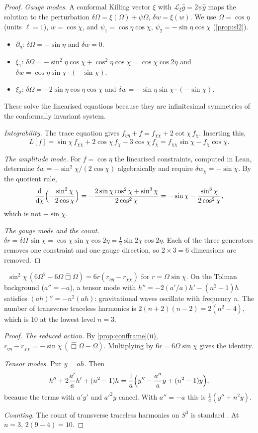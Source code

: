 \begin{proof}
\emph{Gauge modes.} A conformal Killing vector $\xi$ with $\mathcal L_\xi\hat g=2\psi\hat g$ maps the solution to the perturbation $\delta\Omega=\xi(\Omega)+\psi\Omega$, $\delta w=\xi(w)$. We use $\Omega=\cos\eta$ (units $\ell=1$), $w=\cos\chi$, and $\psi_1=\cos\eta\cos\chi$, $\psi_2=-\sin\eta\cos\chi$ (\cref{prop:sl2}).
\begin{itemize}[nosep]
\item $\partial_\eta$: $\delta\Omega=-\sin\eta$ and $\delta w=0$.
\item $\xi_1$: $\delta\Omega=-\sin^2\eta\cos\chi+\cos^2\eta\cos\chi=\cos\chi\cos2\eta$ and $\delta w=\cos\eta\sin\chi\cdot(-\sin\chi)$.
\item $\xi_2$: $\delta\Omega=-2\sin\eta\cos\eta\cos\chi$ and $\delta w=-\sin\eta\sin\chi\cdot(-\sin\chi)$.
\end{itemize}
These solve the linearised equations because they are infinitesimal symmetries of the conformally invariant system.

\emph{Integrability.} The trace equation gives $f_{\eta\eta}+f=f_{\chi\chi}+2\cot\chi\,f_\chi$. Inserting this,
\[
L[f]=\sin\chi\,f_{\chi\chi}+2\cos\chi\,f_\chi-3\cos\chi\,f_\chi=f_{\chi\chi}\sin\chi-f_\chi\cos\chi .
\]

\emph{The amplitude mode.} For $f=\cos\eta$ the linearised constraints, computed in Lean, determine $\delta w=-\sin^2\chi/(2\cos\chi)$ algebraically and require $\delta w_\chi=-\sin\chi$. By the quotient rule,
\[
\frac{\mathrm{d}}{\mathrm{d}\chi}\Bigl(-\frac{\sin^2\chi}{2\cos\chi}\Bigr)=-\frac{2\sin\chi\cos^2\chi+\sin^3\chi}{2\cos^2\chi}=-\sin\chi-\frac{\sin^3\chi}{2\cos^2\chi},
\]
which is not $-\sin\chi$.

\emph{The gauge mode and the count.} $\delta r=\delta\Omega\,\sin\chi=\cos\chi\sin\chi\cos2\eta=\frac12\sin2\chi\cos2\eta$. Each of the three generators removes one constraint and one gauge direction, so $2\times3=6$ dimensions are removed.
\end{proof}


\begin{proposition}\label{prop:gw}\ver\
$\sin^2\chi\,(6\Omega^2-6\Omega\hat\Box\Omega)=6r(r_{\eta\eta}-r_{\chi\chi})$ for $r=\Omega\sin\chi$. On the Tolman background ($a''=-a$), a tensor mode with $h''=-2(a'/a)h'-(n^2-1)h$ satisfies $(ah)''=-n^2(ah)$: gravitational waves oscillate with frequency $n$. The number of transverse traceless harmonics is $2(n+2)(n-2)=2(n^2-4)$, which is $10$ at the lowest level $n=3$.
\end{proposition}
\begin{proof}
\emph{The reduced action.} By \cref{prop:confframe}(ii), $r_{\eta\eta}-r_{\chi\chi}=-\sin\chi\,(\hat\Box\Omega-\Omega)$. Multiplying by $6r=6\Omega\sin\chi$ gives the identity.

\emph{Tensor modes.} Put $y=ah$. Then
\[
h''+2\frac{a'}ah'+(n^2-1)h=\frac1a\Bigl(y''-\frac{a''}ay+(n^2-1)y\Bigr),
\]
because the terms with $a'y'$ and $a'^2y$ cancel. With $a''=-a$ this is $\frac1a(y''+n^2y)$.

\emph{Counting.} The count of transverse traceless harmonics on $S^3$ is standard \ext. At $n=3$, $2(9-4)=10$.
\end{proof}


